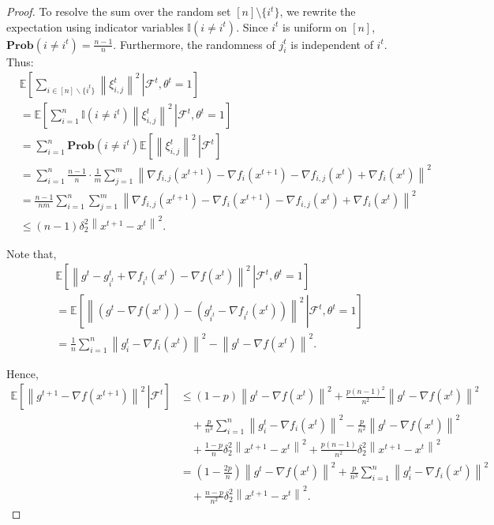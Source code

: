 \documentclass{article}
\newcommand{\sqn}[1]{\left\| #1 \right\|^2}
\newcommand{\Prob}{\mathbf{Prob}}
\newcommand{\Expb}[2]{\mathbb{E}\!\left[\left. #1\,\right|#2 \right]}
\newcommand{\Expc}[1]{\Expb{#1}{\mathcal{F}^t}}
\theoremstyle{plain}
\begin{document}
\begin{proof}
To resolve the sum over the random set $[n]\setminus\{i^t\}$, we rewrite the expectation using indicator variables $\mathbb{I}(i \neq i^t)$. Since $i^t$ is uniform on $[n]$, $\Prob(i \neq i^t) = \frac{n-1}{n}$. Furthermore, the randomness of $j_i^t$ is independent of $i^t$. Thus:
\begin{align*}
&\Expb{\sum_{i\in[n]\backslash\{i^t\}}\sqn{\xi_{i,j}^t}}{\mathcal{F}^t,\theta^t=1}\\
&= \Expb{\sum_{i=1}^n \mathbb{I}(i \neq i^t) \sqn{\xi_{i,j}^t}}{\mathcal{F}^t,\theta^t=1} \\
&= \sum_{i=1}^n \Prob(i \neq i^t) \Expb{\sqn{\xi_{i,j}^t}}{\mathcal{F}^t} \\
&= \sum_{i=1}^n \frac{n-1}{n} \cdot \frac{1}{m}\sum_{j=1}^m \sqn{\nabla f_{i,j}(x^{t+1})-\nabla f_{i}(x^{t+1})-\nabla f_{i,j}(x^{t})+\nabla f_{i}(x^{t})}\\
&=\frac{n-1}{nm}\sum_{i=1}^n \sum_{j=1}^m \sqn{\nabla f_{i,j}(x^{t+1})-\nabla f_{i}(x^{t+1})-\nabla f_{i,j}(x^{t})+\nabla f_{i}(x^{t})}\\
&\leq (n-1)\delta_2^2\sqn{x^{t+1}-x^t}.
\end{align*}

Note that,
\begin{align*}
&\Expb{\sqn{g^{t}-g_{i^t}^t+\nabla f_{i^t}(x^{t})-\nabla f(x^{t})}}{\mathcal{F}^t,\theta^t=1} \\
&= \Expb{\sqn{(g^t - \nabla f(x^t)) - (g_{i^t}^t - \nabla f_{i^t}(x^t))}}{\mathcal{F}^t,\theta^t=1} \\
&= \frac{1}{n}\sum_{i=1}^n \sqn{g_i^t - \nabla f_i(x^t)} - \sqn{g^t - \nabla f(x^t)}.
\end{align*}

Hence,
 \begin{align*}
\Expc{\sqn{g^{t+1}-\nabla f(x^{t+1})}} &\leq (1-p)\sqn{g^{t}-\nabla f(x^{t})}+ \frac{p(n-1)^2}{n^2}\sqn{g^t-\nabla f(x^t)}\\
&\quad+\frac{p}{n^3}\sum_{i=1}^n\sqn{g_{i}^t-\nabla f_{i}(x^{t})}-\frac{p}{n^2}\sqn{g^t-\nabla f(x^{t})}\\
&\quad+\frac{1-p}{n} \delta_2^2\sqn{x^{t+1}-x^t}+\frac{p(n-1)}{n^2}\delta_2^2\sqn{x^{t+1}-x^t}\\
&= \left(1-\frac{2p}{n}\right)\sqn{g^t-\nabla f(x^t)}+\frac{p}{n^3}\sum_{i=1}^n\sqn{g_{i}^t-\nabla f_{i}(x^{t})}\\
&\quad+\frac{n-p}{n^2}\delta_2^2\sqn{x^{t+1}-x^t}.
\end{align*}
\end{proof}
\end{document}
